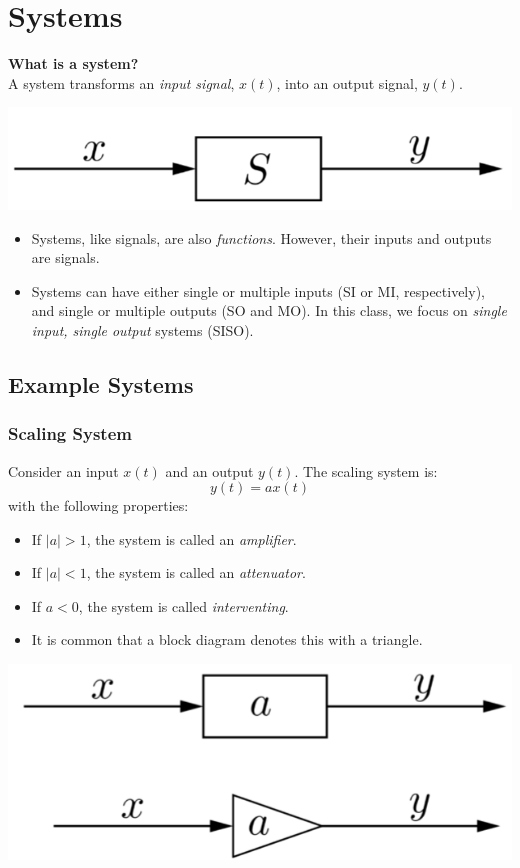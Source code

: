 \documentclass[10pt]{article}
\begin{document}
\section*{Systems}
\textbf{What is a system?}\\
A system transforms an \textit{input signal}, $x(t)$, into an output signal, $y(t)$.
\begin{center}
    \includegraphics[scale=0.8]{W2_9.png}
\end{center}
\begin{itemize}
    \item Systems, like signals, are also \textit{functions}.  However, their inputs and outputs are signals.
    \item Systems can have either single or multiple inputs (SI or MI, respectively), and single or multiple outputs (SO and MO).  In this class, we focus on \textit{single input, single output} systems (SISO).
\end{itemize}
\subsection*{Example Systems}
\subsubsection*{Scaling System}
Consider an input $x(t)$ and an output $y(t)$.  The scaling system is:
\[y(t) = ax(t)\]
with the following properties:
\begin{itemize}
    \item If $|a| > 1$, the system is called an \textit{amplifier}.
    \item If $|a| < 1$, the system is called an \textit{attenuator}.
    \item If $a < 0$, the system is called \textit{interventing}.
    \item It is common that a block diagram denotes this with a triangle.
\end{itemize}
\begin{center}
    \includegraphics[scale=0.8]{W2_10.png}
\end{center}
\end{document}
